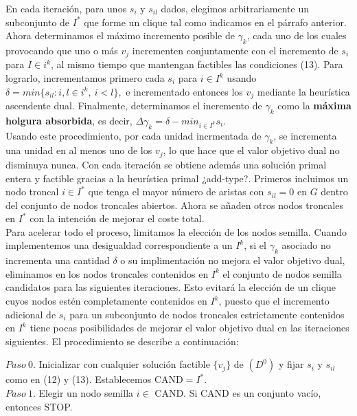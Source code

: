 \documentclass[twoside,12pt]{article}
\begin{document}
En cada iteración, para unos $s_{i}$ y $s_{il}$ dados, elegimos arbitrariamente un subconjunto de $I^{*}$ que forme un clique tal como indicamos en el párrafo anterior. Ahora determinamos el máximo incremento posible de $\gamma_{k}$, cada uno de los cuales provocando que uno o más $v_{j}$ incrementen conjuntamente con el incremento de $s_{i}$ para $I\in i^{k}$, al mismo tiempo que mantengan factibles las condiciones (13). Para lograrlo, incrementamos primero cada $s_{i}$ para $i\in I^{k}$ usando $\delta=min\{s_{il}:i,l \in i^{k},\ i<l\},$ e incrementado entonces los $v_{j}$ mediante la heurística ascendente dual. Finalmente, determinamos el incremento de $\gamma_{k}$ como la \textbf{máxima holgura absorbida}, es decir, $\Delta\gamma_{k}=\delta-min_{i\in I^{k}}s_{i}$.\\

Usando este procedimiento, por cada unidad incrmentada de $\gamma_{k}$, se incrementa una unidad en al menos uno de los $v_{j}$, lo que hace que el valor objetivo dual no disminuya nunca. Con cada iteración se obtiene además una solución primal entera y factible gracias a la heurística primal ¿add-type?. Primeros incluimos un nodo troncal $i\in I^{*}$ que tenga el mayor número de aristas con $s_{il}=0$ en $G$ dentro del conjunto de nodos troncales abiertos. Ahora se añaden otros nodos troncales en $I^{*}$ con la intención de mejorar el coste total.\\

Para acelerar todo el proceso, limitamos la elección de los nodos semilla. Cuando implementemos una desigualdad correspondiente a un $I^{k}$, si el $\gamma_{k}$ asociado no incrementa una cantidad $\delta$ o su implimentación no mejora el valor objetivo dual, eliminamos en los nodos troncales contenidos en $I^{k}$ el conjunto de nodos semilla candidatos para las siguientes iteraciones. Esto evitará la elección de un clique cuyos nodos estén completamente contenidos en $I^{k}$, puesto que el incremento adicional de $s_{i}$ para un subconjunto de nodos troncales estrictamente contenidos en $I^{k}$ tiene pocas posibilidades de mejorar el valor objetivo dual en las iteraciones siguientes. El procedimiento se describe a continuación:

$Paso \ 0$. Inicializar con cualquier solución factible $\{v_{j}\}$ de $(D^{0})$ y fijar $s_{i}$ y $s_{il}$ como en (12) y (13). Establecemos $\text{CAND}=I^{*}$.\\

$Paso\ 1$. Elegir un nodo semilla $i\in$ CAND. Si CAND es un conjunto vacío, entonces STOP.\\
\end{document}

